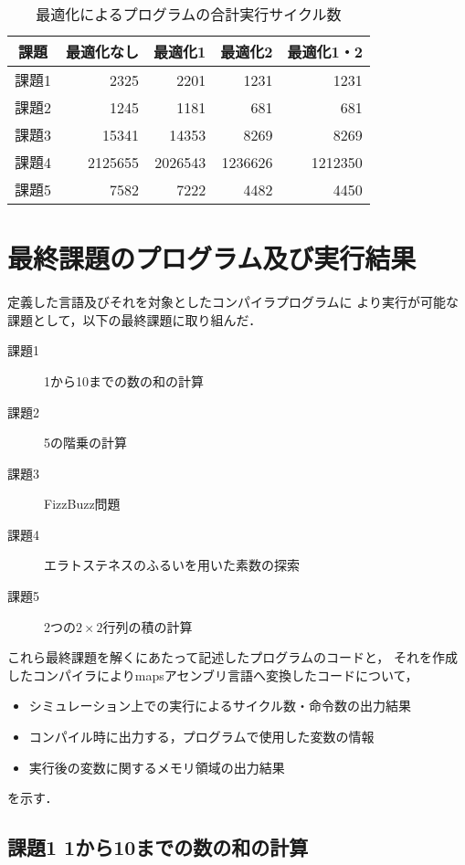 \begin{table}[htbp]
  \centering
  \begin{tabular}{|c|r|r|r|r|}
    \hline
      課題 & 最適化なし & 最適化1 & 最適化2 & 最適化1・2 \\
    \hline
    \hline
      課題1 & 2325 & 2201 & 1231 & 1231 \\
    \hline
      課題2 & 1245 & 1181 & 681 & 681 \\
    \hline
      課題3 & 15341 & 14353 & 8269 & 8269 \\
    \hline
      課題4 & 2125655 & 2026543 & 1236626 & 1212350\\
    \hline
      課題5 & 7582 & 7222 & 4482 & 4450\\
    \hline
  \end{tabular}
  \caption{最適化によるプログラムの合計実行サイクル数}
  \label{tab:cycle-tab}
\end{table}


\section{最終課題のプログラム及び実行結果}
定義した言語及びそれを対象としたコンパイラプログラムに
より実行が可能な課題として，以下の最終課題に取り組んだ．
\begin{description}
  \item[課題1] 1から10までの数の和の計算
  \item[課題2] 5の階乗の計算
  \item[課題3] FizzBuzz問題
  \item[課題4] エラトステネスのふるいを用いた素数の探索
  \item[課題5] 2つの$2 \times 2$行列の積の計算 
\end{description}

これら最終課題を解くにあたって記述したプログラムのコードと，
それを作成したコンパイラによりmapsアセンブリ言語へ変換したコードについて，
\begin{itemize}
  \item シミュレーション上での実行によるサイクル数・命令数の出力結果
  \item コンパイル時に出力する，プログラムで使用した変数の情報
  \item 実行後の変数に関するメモリ領域の出力結果
\end{itemize}
を示す．

\subsection{課題1 1から10までの数の和の計算}

